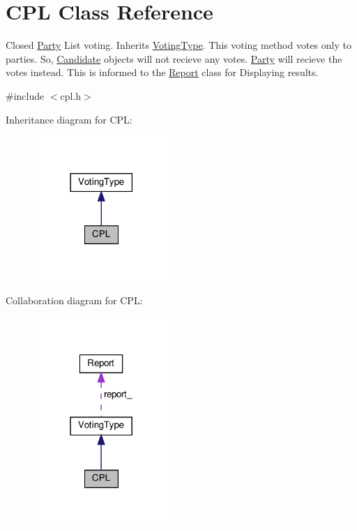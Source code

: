 \hypertarget{classCPL}{}\section{C\+PL Class Reference}
\label{classCPL}


Closed \hyperlink{classParty}{Party} List voting. Inherits \hyperlink{classVotingType}{Voting\+Type}. This voting method votes only to parties. So, \hyperlink{classCandidate}{Candidate} objects will not recieve any votes. \hyperlink{classParty}{Party} will recieve the votes instead. This is informed to the \hyperlink{classReport}{Report} class for Displaying results.  




{\ttfamily \#include $<$cpl.\+h$>$}



Inheritance diagram for C\+PL\+:
\nopagebreak
\begin{figure}[H]
\begin{center}
\leavevmode
\includegraphics[width=146pt]{classCPL__inherit__graph}
\end{center}
\end{figure}


Collaboration diagram for C\+PL\+:
\nopagebreak
\begin{figure}[H]
\begin{center}
\leavevmode
\includegraphics[width=147pt]{classCPL__coll__graph}
\end{center}
\end{figure}
